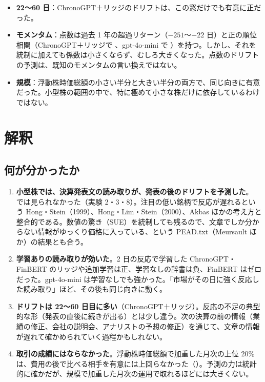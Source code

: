 \begin{itemize}
\item \textbf{22〜60 日}：ChronoGPT＋リッジのドリフトは、この窓だけでも有意に正だった。
\item \textbf{モメンタム}：点数は過去 1 年の超過リターン（$-251$〜$-22$ 日）と正の順位相関（ChronoGPT＋リッジで 、gpt-4o-mini で ）を持つ。しかし、それを統制に加えても係数は小さくならず、むしろ大きくなった。点数のドリフトの予測は、既知のモメンタムの言い換えではない。
\item \textbf{規模}：浮動株時価総額の小さい半分と大きい半分の両方で、同じ向きに有意だった。小型株の範囲の中で、特に極めて小さな株だけに依存しているわけではない。
\end{itemize}

\chapter{解釈}\label{ch:interpret}

\section{何が分かったか}

\begin{enumerate}
\item \textbf{小型株では、決算発表文の読み取りが、発表の後のドリフトを予測した}。\SP{} では見られなかった（実験 2・3・8）。注目の低い銘柄で反応が遅れるという Hong・Stein（1999）、Hong・Lim・Stein（2000）、Akbas ほかの考え方と整合的である。数値の驚き（SUE）を統制しても残るので、文章でしか分からない情報がゆっくり価格に入っている、という PEAD.txt（Meursault ほか）の結果とも合う。
\item \textbf{学習ありの読み取りが効いた}。2 日の反応で学習した ChronoGPT・FinBERT のリッジや追加学習は正、学習なしの辞書は負、FinBERT はゼロだった。gpt-4o-mini は学習なしでも強かった。「市場がその日に強く反応した読み取り」ほど、その後も同じ向きに動く。
\item \textbf{ドリフトは 22〜60 日目に多い}（ChronoGPT＋リッジ）。反応の不足の典型的な形（発表の直後に続きが出る）とは少し違う。次の決算の前の情報（業績の修正、会社の説明会、アナリストの予想の修正）を通じて、文章の情報が遅れて確かめられていく過程かもしれない。
\item \textbf{取引の成績にはならなかった}。浮動株時価総額で加重した月次の上位 20\% は、費用の後で比べる相手を有意には上回らなかった（）。予測の力は統計的に確かだが、規模で加重した月次の運用で取れるほどには大きくない。
\end{enumerate}

